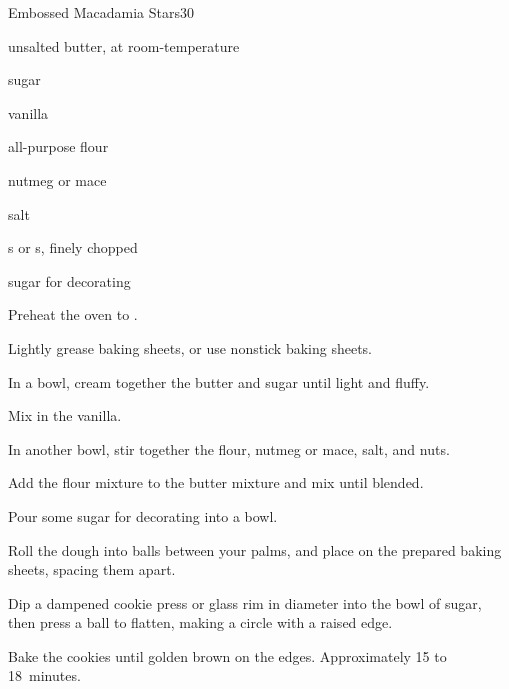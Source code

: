 \begin{recipe}{Embossed Macadamia Stars}{}{30}

\begin{ingredients}
\item {} unsalted butter, at room-temperature
\item \C{\half} sugar
\item {} vanilla
\item {} all-purpose flour
\item \tp{\half} nutmeg or mace
\item \tp{\eighth} salt
\item \C{\half} s or s, finely chopped
\item sugar for decorating
\end{ingredients}

\begin{directions}
\item Preheat the oven to .
\item Lightly grease baking sheets, or use nonstick baking sheets.
\item In a bowl, cream together the butter and sugar until light and fluffy.
\item Mix in the vanilla.
\item In another bowl, stir together the flour, nutmeg or mace, salt, and nuts.
\item Add the flour mixture to the butter mixture and mix until blended.
\item Pour some sugar for decorating into a bowl.
\item Roll the dough into \inch{\threequarter} balls between your palms, and place on the prepared baking sheets, spacing them  apart.
\item Dip a dampened cookie press or glass rim \inch{2\quarter} in diameter into the bowl of sugar, then press a ball to flatten, making a circle with a raised edge.
\item Bake the cookies until golden brown on the edges. Approximately 15 to 18~minutes.
\end{directions}


\end{recipe}
